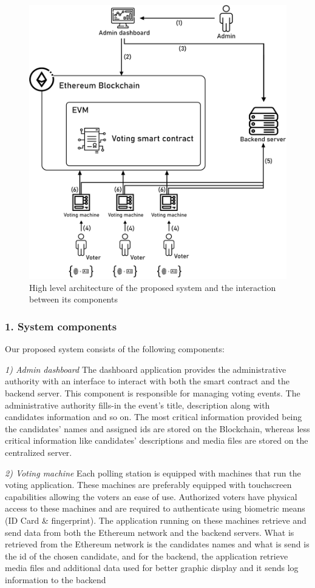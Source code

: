 \begin{figure}[H]
	\centering
		\includegraphics[width=12cm]{images/chapter3/architecture.png}
		\caption{{\footnotesize High level architecture of the proposed system and the interaction between its components}}
\end{figure}

\subsubsection{1. System components}

Our proposed system consists of the following components:

\textit{1) Admin dashboard} The dashboard application provides the administrative authority with an interface to interact with both the smart contract and the backend server. This component is responsible for managing voting events. The administrative authority fills-in the event's title, description along with candidates information and so on. The most critical information provided being the candidates' names and assigned ids are stored on the Blockchain, whereas less critical information like candidates' descriptions and media files are stored on the centralized server.

\textit{2) Voting machine} Each polling station is equipped with machines that run the voting application. These machines are preferably equipped with touchscreen capabilities allowing the voters an ease of use. Authorized voters have physical access to these machines and are required to authenticate using biometric means (ID Card \& fingerprint). The application running on these machines retrieve and send data from both the Ethereum network and the backend servers. What is retrieved from the Ethereum network is the candidates names and what is send is the id of the chosen candidate, and for the backend, the application retrieve media files and additional data used for better graphic display and it sends log information to the backend

